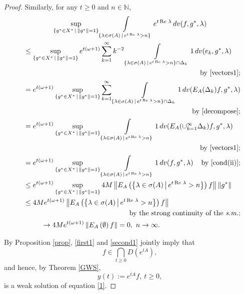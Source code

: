 \documentclass{amsart}
\theoremstyle{plain}
\theoremstyle{definition}
\begin{document}
\begin{proof}
Similarly, for any $t\ge 0$ and $n\in{{\mathbb N}}$,
\begin{multline}\label{second1}
\sup_{\{g^*\in X^*\,|\,\|g^*\|=1\}}
\int\limits_{\left\{\lambda\in\sigma(A)\,\middle|\,e^{t\operatorname{Re\,}\lambda}>n\right\}} 
e^{t\operatorname{Re\,}\lambda}\,dv(f,g^*,\lambda)
\\
\shoveleft{
\le 
\sup_{\{g^*\in X^*\,|\,\|g^*\|=1\}}e^{t(\omega+1)}\sum_{k=1}^\infty k^{-2}
\int\limits_{\left\{\lambda\in\sigma(A)\,\middle|\,e^{t\operatorname{Re\,}\lambda}>n\right\}\cap \Delta_k}1\,dv(e_k,g^*,\lambda) 
}\\
\hfill \text{by \eqref{vectors1};}
\\
\shoveleft{
=e^{t(\omega+1)}\sup_{\{g^*\in X^*\,|\,\|g^*\|=1\}}\sum_{k=1}^\infty 
\int\limits_{\left\{\lambda\in\sigma(A)\,\middle|\,e^{t\operatorname{Re\,}\lambda}>n\right\}\cap \Delta_k}1\,dv(E_A(\Delta_k)f,g^*,\lambda) 
}\\
\hfill \text{by \eqref{decompose};}
\\
\shoveleft{
= e^{t(\omega+1)}\sup_{\{g^*\in X^*\,|\,\|g^*\|=1\}}
\int\limits_{\{\lambda\in\sigma(A)\,|\,e^{t\operatorname{Re\,}\lambda}>n\}}1\,dv(E_A(\cup_{k=1}^\infty\Delta_k)f,g^*,\lambda)
}\\
\hfill \text{by \eqref{vectors1};}
\\
\shoveleft{
= e^{t(\omega+1)}\sup_{\{g^*\in X^*\,|\,\|g^*\|=1\}}
\int\limits_{\{\lambda\in\sigma(A)\,|\,e^{t\operatorname{Re\,}\lambda}>n\}}1\,dv(f,g^*,\lambda)
\hfill
\text{by \eqref{cond(ii)};}
}\\
\shoveleft{
\le e^{t(\omega+1)}\sup_{\{g^*\in X^*\,|\,\|g^*\|=1\}}4M\left\|E_A\left(\left\{\lambda\in\sigma(A)\,\middle|\,e^{t\operatorname{Re\,}\lambda}>n\right\}\right)f\right\|\|g^*\|
}\\
\shoveleft{
\le 4Me^{t(\omega+1)}\left\|E_A\left(\left\{\lambda\in\sigma(A)\,\middle|\,e^{t\operatorname{Re\,}\lambda}>n\right\}\right)f\right\|
}\\
\hfill
\text{by the strong continuity of the {\it s.m.};}
\\
\hspace{1.2cm}
\to 4Me^{t(\omega+1)}\left\|E_A\left(\emptyset\right)f\right\|=0,\ n\to\infty.
\hfill
\end{multline}

By Proposition \ref{prop}, \eqref{first1} and \eqref{second1} jointly imply that
\[
f\in \bigcap\limits_{t\ge 0}D(e^{tA}),
\] 
and hence,
by Theorem \ref{GWS},
\[
y(t):=e^{tA}f,\ t\ge 0,
\]
is a weak solution of equation \eqref{1}.


\end{proof}
\end{document}
